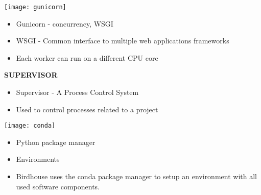 \documentclass[portrait,a0paper,fontscale=0.4]{baposter} %
\newcommand{\compresslist}{%
\setlength{\itemsep}{1pt}%
\setlength{\parskip}{0pt}%
\setlength{\parsep}{0pt}%
}
\begin{document}
\begin{poster}
{\begin{multicols}{2}
\begin{minipage}{0.5\textwidth}
    \begin{minipage}{0.15\textwidth}
      \texttt{[image: gunicorn]}
    \end{minipage}
    \begin{minipage}{0.85\textwidth}
      \begin{itemize}\compresslist
        \item Gunicorn - concurrency, WSGI
        \item WSGI - Common interface to multiple web applications frameworks
        \item Each worker can run on a different CPU core
      \end{itemize}
    \end{minipage}

    \begin{minipage}{0.15\textwidth}
      {\bf SUPERVISOR}
    \end{minipage}
    \begin{minipage}{0.85\textwidth}
      \begin{itemize}\compresslist
        \item Supervisor - A Process Control System
        \item Used to control processes related to a project
      \end{itemize}
    \end{minipage}

  \end{minipage}
  \begin{minipage}{0.5\textwidth}

    \begin{minipage}{0.15\textwidth}
      \texttt{[image: conda]}
    \end{minipage}
    \begin{minipage}{0.85\textwidth}
      \begin{itemize}\compresslist
        \item Python package manager
        \item Environments
        \item Birdhouse uses the conda package manager to setup an environment with all used software components.
      \end{itemize}
    \end{minipage}


\end{minipage}
\end{multicols}}
\end{poster}
\end{document}
